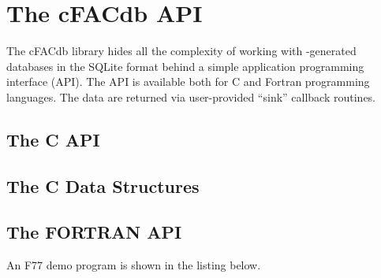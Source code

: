\chapter{The cFACdb API}
\label{cha:cfacdb}

The cFACdb library hides all the complexity of working with \cFAC-generated
databases in the SQLite format behind a simple application programming interface
(API). The API is available both for C and Fortran programming languages. The
data are returned via user-provided ``sink'' callback routines.

\section{The C API}


\section{The C Data Structures}










\section{The FORTRAN API}

An F77 demo program is shown in the listing below.
 
\lstset{language=[77]Fortran,numbers=left,caption=An F77 demo}


